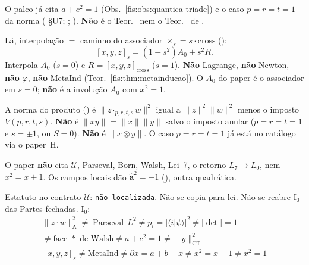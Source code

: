 \documentclass[livro.tex]{subfiles}
\begin{document}
\begin{observacao}\label{fis:obs:quantica-paper-a-norma}
O palco já cita $a+c^{2}=1$
(Obs.~\ref{fis:obs:quantica-triade})
e o caso $p=r=t=1$ da norma
( §U7;
;
).
\textbf{Não} é o Teor.~
nem o Teor.~
de
.

Lá, interpolação $=$ caminho do
associador $\times_s=s\cdot\mathrm{cross}$
():
\[
[x,y,z]_s=(1-s^{2})A_0+s^{2}R.
\]
Interpola $A_0$ ($s=0$) e
$R=[x,y,z]_{\mathrm{cross}}$ ($s=1$).
\textbf{Não} Lagrange, \textbf{não}
Newton, \textbf{não} $\varphi$,
\textbf{não} MetaInd
(Teor.~\ref{fis:thm:metainducao}).
O $A_0$ do paper é o associador
em $s=0$; \textbf{não} é a
involução $A_0$ com $x^{2}=1$.

A norma do produto
()
é
$\lVert z\cdot_{p,r,t,s}w\rVert^{2}$
igual a
$\lVert z\rVert^{2}\lVert w\rVert^{2}$
menos o imposto $V(p,r,t,s)$.
\textbf{Não} é
$\lVert xy\rVert=\lVert x\rVert\lVert y\rVert$
salvo o imposto anular
($p=r=t=1$ e $s=\pm1$, ou $S=0$).
\textbf{Não} é $\lVert x\otimes y\rVert$.
O caso $p=r=t=1$ já está no
catálogo via o paper~H.

O paper \textbf{não} cita
$\mathcal{U}$, Parseval, Born,
Walsh, Lei~7, o retorno
$L_7\to L_0$,
nem $x^{2}=x+1$.
Os campos locais dão
$\hat{\mathbf{a}}^{2}=-1$
(),
outra quadrática.

Estatuto no contrato $\mathcal{U}$:
\texttt{não localizada}.
Não se copia para lei.
Não se reabre $\mathrm{I}_{0}$
das Partes fechadas.
$\mathrm{I}_{0}$:
\[
\boxed{\;
\begin{gathered}
\lVert z\cdot w\rVert^{2}_{\mathrm{A}}
\neq
\operatorname{Parseval}\,L^{2}
\neq
p_{i}=\lvert\langle i\rvert\psi\rangle\rvert^{2}
\neq
\lvert\det\rvert=1
\\
\neq
\text{face }*\text{ de Walsh}
\neq
a+c^{2}=1
\neq
\lVert y\rVert^{2}_{\mathrm{CT}}
\\
[x,y,z]_s
\neq
\text{MetaInd}
\neq
\partial x=a+b-x
\neq
x^{2}=x+1
\neq
x^{2}=1
\end{gathered}
\;}
\]
\end{observacao}
\end{document}
